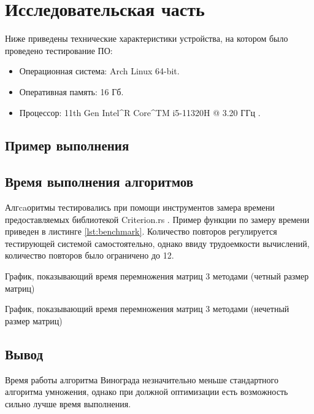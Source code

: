 \chapter{Исследовательская часть}
Ниже приведены технические характеристики устройства, на котором было проведено тестирование ПО:

\begin{itemize}
    \item Операционная система: Arch Linux \cite{arch} 64-bit.
    \item Оперативная память: 16 Гб.
    \item Процессор: 11th Gen Intel^R Core^{TM} i5-11320H @ 3.20 ГГц \cite{i5}.
\end{itemize}

\section{Пример выполнения}
%
\newpage

\section{Время выполнения алгоритмов}
Алгcaоритмы тестировались при помощи инструментов замера времени предоставляемых библиотекой Criterion.rs \cite{Criterion}.
Пример функции по замеру времени приведен в листинге \ref{lst:benchmark}.
Количество повторов регулируется тестирующей системой самостоятельно, однако ввиду трудоемкости вычислений, количество повторов было ограничено до 12.


График, показывающий время перемножения матриц 3 методами (четный размер матриц)\newline
%

График, показывающий время перемножения матриц 3 методами (нечетный размер матриц)\newline
%

\section*{Вывод}

Время работы алгоритма Винограда незначительно меньше стандартного алгоритма умножения, однако при должной оптимизации есть возможность сильно лучше время выполнения.